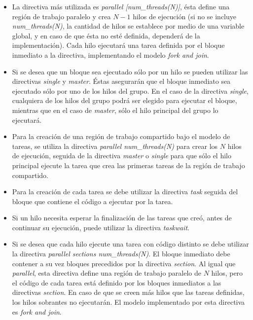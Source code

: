 \begin{itemize}

	\item	La directiva más utilizada es \emph{parallel [num\_threads(N)]},
		ésta define una región de trabajo paralelo y crea $N-1$ hilos de
		ejecución (si no se incluye \emph{num\_threads(N)}, la cantidad
		de hilos se establece por medio de una variable global, y en
		caso de que ésta no esté definida, dependerá de la
		implementación). Cada hilo ejecutará una tarea definida por el
		bloque inmediato a la directiva, implementando el modelo
		\emph{fork and join}.

	\item	Si se desea que un bloque sea ejecutado sólo por un hilo se pueden
		utilizar las directivas \emph{single} y \emph{master}. Éstas
		asegurarán que el bloque inmediato sea ejecutado sólo por uno de
		los hilos del grupo. En el caso de la directiva \emph{single},
		cualquiera de los hilos del grupo podrá ser elegido para
		ejecutar el bloque, mientras que en el caso de \emph{master},
		sólo el hilo principal del grupo lo ejecutará.

	\item	Para la creación de una región de trabajo compartido bajo el
		modelo de tareas, se utiliza la directiva \emph{parallel
		num\_threads(N)} para crear los $N$ hilos de ejecución, seguida
		de la directiva \emph{master} o \emph{single} para que sólo el
		hilo principal ejecute la tarea que crea las primeras tareas de
		la región de trabajo compartido.
	
	\item	Para la creación de cada tarea se debe utilizar la directiva
		\emph{task} seguida del bloque que contiene el código a ejecutar
		por la tarea.

	\item	Si un hilo necesita esperar la finalización de las tareas que
		creó, antes de continuar su ejecución, puede utilizar la
		directiva \emph{taskwait}.

	\item	Si se desea que cada hilo ejecute una tarea con código distinto se
		debe utilizar la directiva \emph{parallel sections
		num\_threads(N)}. El bloque inmediato debe contener a su vez
		bloques precedidos por la directiva \emph{section}. Al igual que
		\emph{parallel}, esta directiva define una región de trabajo
		paralelo de $N$ hilos, pero el código de cada tarea está
		definido por los bloques inmediatos a las directivas
		\emph{section}. En caso de que se creen más hilos que las tareas
		definidas, los hilos sobrantes no ejecutarán. El modelo
		implementado por esta directiva es \emph{fork and join}.


\end{itemize}
